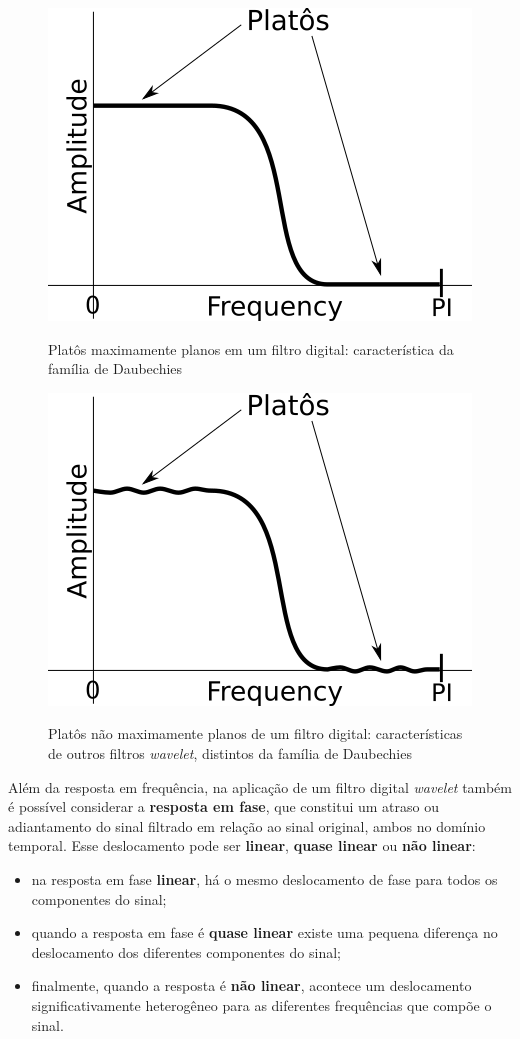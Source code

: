 			\begin{figure}[h]
				\centering
				\caption[Platôs maximamente planos Daubechies]{Platôs maximamente planos em um filtro digital: característica da família de Daubechies}
				\includegraphics[width=0.3\linewidth]{images/daubechies}
				\label{fig:daubechies}
			\end{figure}
			
			\begin{figure}[h]
				\centering
				\caption[Platôs maximamente planos outros filtros]{Platôs não maximamente planos de um filtro digital: características de outros filtros \textit{wavelet}, distintos da família de Daubechies}
				\includegraphics[width=0.3\linewidth]{images/noMaximallyFlat}
				\label{fig:nomaximallyflat}
			\end{figure}
			
			\par Além da resposta em frequência, na aplicação de um filtro digital \textit{wavelet} também é possível considerar a \textbf{resposta em fase}, que constitui um atraso ou adiantamento do sinal filtrado em relação ao sinal original, ambos no domínio temporal. Esse deslocamento pode ser \textbf{linear}, \textbf{quase linear} ou \textbf{não linear}: 
	
			\begin{itemize}
				\item na resposta em fase \textbf{linear}, há o mesmo deslocamento de fase para todos os componentes do sinal;
				\item quando a resposta em fase é \textbf{quase linear} existe uma pequena diferença no deslocamento dos diferentes componentes do sinal;
				\item finalmente, quando a resposta é \textbf{não linear}, acontece um deslocamento significativamente heterogêneo para as diferentes frequências que compõe o sinal.
			\end{itemize}
			
